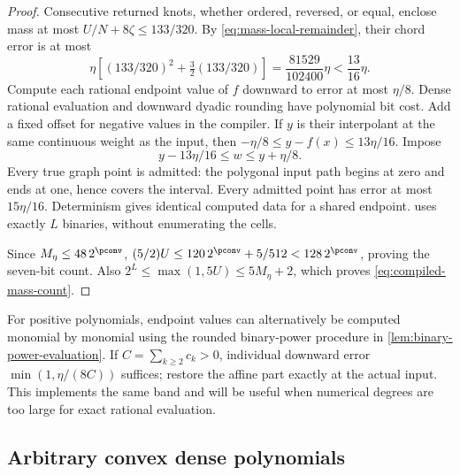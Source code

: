 \begin{proof}
Consecutive returned knots, whether ordered, reversed, or equal, enclose
mass at most $U/N+8\zeta\le133/320$. By
\eqref{eq:mass-local-remainder}, their chord error is at most
\[
 \eta\left[(133/320)^2+\tfrac32(133/320)\right]
 =\frac{81529}{102400}\eta<\frac{13}{16}\eta.
\]
Compute each rational endpoint value of $f$ downward to error at most
$\eta/8$. Dense rational evaluation and downward dyadic rounding have
polynomial bit cost. Add a fixed offset for negative values in the
compiler. If $y$ is their interpolant at the same continuous weight as
the input, then $-\eta/8\le y-f(x)\le13\eta/16$. Impose
\begin{equation}\label{eq:compiled-scalar-band}
 y-13\eta/16\le w\le y+\eta/8.
\end{equation}
Every true graph point is admitted: the polygonal input path begins
at zero and ends at one, hence covers the interval. Every admitted
point has error at most $15\eta/16$. Determinism gives identical
computed data for a shared endpoint. 
uses exactly $L$ binaries, without enumerating the cells.

Since $M_\eta\le48\,2^{\pconv}$,
$(5/2)U\le120\,2^{\pconv}+5/512<128\,2^{\pconv}$, proving
the seven-bit count. Also $2^L\le\max(1,5U)\le5M_\eta+2$,
which proves \eqref{eq:compiled-mass-count}.
\end{proof}

For positive polynomials, endpoint values can alternatively be computed
monomial by monomial using the rounded binary-power procedure in
\cref{lem:binary-power-evaluation}. If $C=\sum_{k\ge2}c_k>0$,
individual downward error $\min(1,\eta/(8C))$ suffices; restore the
affine part exactly at the actual input. This implements the same band
and will be useful when numerical degrees are too large for exact
rational evaluation.

\subsection{Arbitrary convex dense polynomials}

